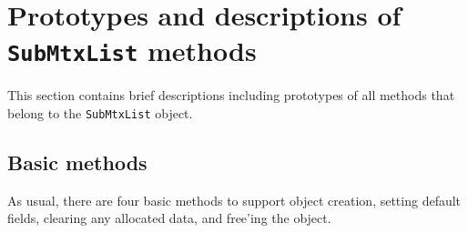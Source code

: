 \par
\section{Prototypes and descriptions of {\tt SubMtxList} methods}
\label{section:SubMtxList:proto}
\par
This section contains brief descriptions including prototypes
of all methods that belong to the {\tt SubMtxList} object.
\par
\subsection{Basic methods}
\label{subsection:SubMtxList:proto:basics}
\par
As usual, there are four basic methods to support object creation,
setting default fields, clearing any allocated data, and free'ing
the object.
\par
